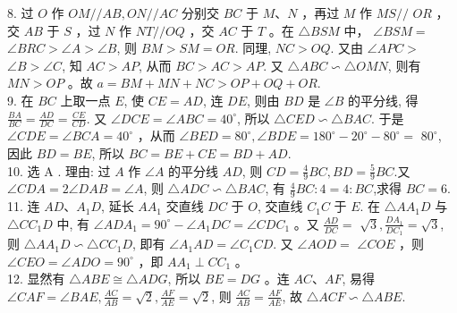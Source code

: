 \documentclass[10pt]{article}
\begin{document}
8. 过 $O$ 作 $O M / / A B, O N / / A C$ 分别交 $B C$ 于 $M 、 N$ ，再过 $M$ 作 $M S / /$ $O R$ ，交 $A B$ 于 $S$ ，过 $N$ 作 $N T / / O Q$ ，交 $A C$ 于 $T$ 。在 $\triangle B S M$ 中， $\angle B S M=$ $\angle B R C>\angle A>\angle B$, 则 $B M>S M=O R$. 同理, $N C>O Q$. 又由 $\angle A P C>$ $\angle B>\angle C$, 知 $A C>A P$, 从而 $B C>A C>A P$. 又 $\triangle A B C \backsim \triangle O M N$, 则有 $M N>O P$ 。故 $a=B M+M N+N C>O P+O Q+O R$.\\
9. 在 $B C$ 上取一点 $E$, 使 $C E=A D$, 连 $D E$, 则由 $B D$ 是 $\angle B$ 的平分线, 得 $\frac{B A}{B C}=\frac{A D}{D C}=\frac{C E}{C D}$. 又 $\angle D C E=\angle A B C=40^{\circ}$, 所以 $\triangle C E D \backsim \triangle B A C$. 于是 $\angle C D E=\angle B C A=40^{\circ}$ ，从而 $\angle B E D=80^{\circ}, \angle B D E=180^{\circ}-20^{\circ}-80^{\circ}=$ $80^{\circ}$, 因此 $B D=B E$, 所以 $B C=B E+C E=B D+A D$.\\
10. 选 A . 理由: 过 $A$ 作 $\angle A$ 的平分线 $A D$, 则 $C D=\frac{4}{9} B C, B D=\frac{5}{9} B C$.又 $\angle C D A=2 \angle D A B=\angle A$, 则 $\triangle A D C \backsim \triangle B A C$, 有 $\frac{4}{9} B C: 4=4: B C$,求得 $B C=6$.\\
11. 连 $A D 、 A_{1} D$, 延长 $A A_{1}$ 交直线 $D C$ 于 $O$, 交直线 $C_{1} C$ 于 $E$. 在 $\triangle A A_{1} D$ 与 $\triangle C C_{1} D$ 中, 有 $\angle A D A_{1}=90^{\circ}-\angle A_{1} D C=\angle C D C_{1}$ 。又 $\frac{A D}{D C}=$ $\sqrt{3}, \frac{D A_{1}}{D C_{1}}=\sqrt{3}$, 则 $\triangle A A_{1} D \backsim \triangle C C_{1} D$, 即有 $\angle A_{1} A D=\angle C_{1} C D$. 又 $\angle A O D=$ $\angle C O E$ ，则 $\angle C E O=\angle A D O=90^{\circ}$ ，即 $A A_{1} \perp C C_{1}$ 。\\
12. 显然有 $\triangle A B E \cong \triangle A D G$, 所以 $B E=D G$ 。连 $A C 、 A F$, 易得 $\angle C A F=\angle B A E, \frac{A C}{A B}=\sqrt{2}, \frac{A F}{A E}=\sqrt{2}$, 则 $\frac{A C}{A B}=\frac{A F}{A E}$, 故 $\triangle A C F \backsim \triangle A B E$.
\end{document}
